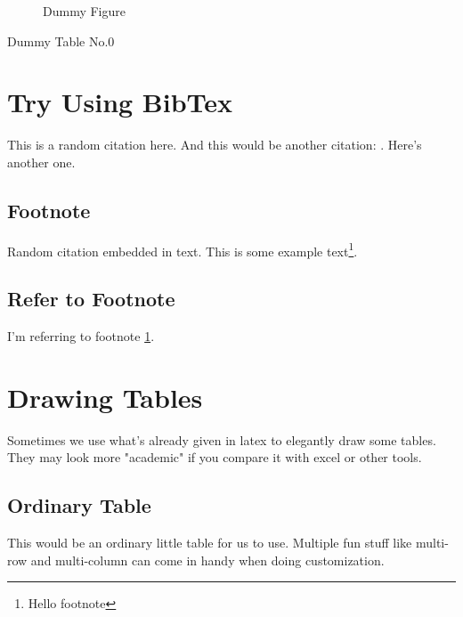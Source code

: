 \documentclass{article}
\begin{document}
\begin{figure}[!ht]
    \caption{Dummy Figure}
\end{figure}

\begin{table}[!ht]
    \caption{Dummy Table No.0}
\end{table}


\newpage
\section{Try Using BibTex}

This is a random citation \autocite{LeeRice-4} here.
And this would be another citation: \autocite{AragonRios-30}.
Here's another \autocite{Starobin-32} one.

\subsection{Footnote}
Random citation \autocite{LeeRice-4} embedded in text.
This is some example text\footnote{\label{myfootnote}Hello footnote}.

\subsection{Refer to Footnote}
I'm referring to footnote \ref{myfootnote}.

\section{Drawing Tables}
Sometimes we use what's already given in latex to elegantly draw some tables. They may look more "academic" if you compare it with excel or other tools.

\subsection{Ordinary Table}
This would be an ordinary little table for us to use. Multiple fun stuff like multi-row and multi-column can come in handy when doing customization.
\end{document}
